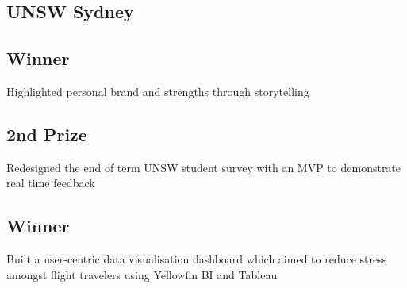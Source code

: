 \documentclass[11pt, a4paper]{TechCV}
\begin{document}
\begin{minipage}[t]{0.38\textwidth}
\sectionsep
\subsection{UNSW Sydney}
\vspace{\topsep} %
\sectionsep

\sectionsep
\subsection{Winner}
Highlighted personal brand and strengths through storytelling
\sectionsep

\subsection{2nd Prize}
Redesigned the end of term UNSW student survey with an MVP to demonstrate real time feedback
\sectionsep

\subsection{Winner}
Built a user-centric data visualisation dashboard which aimed to reduce stress amongst flight travelers using Yellowfin BI and Tableau
\sectionsep

\end{minipage} 
\hfill
\end{document}

